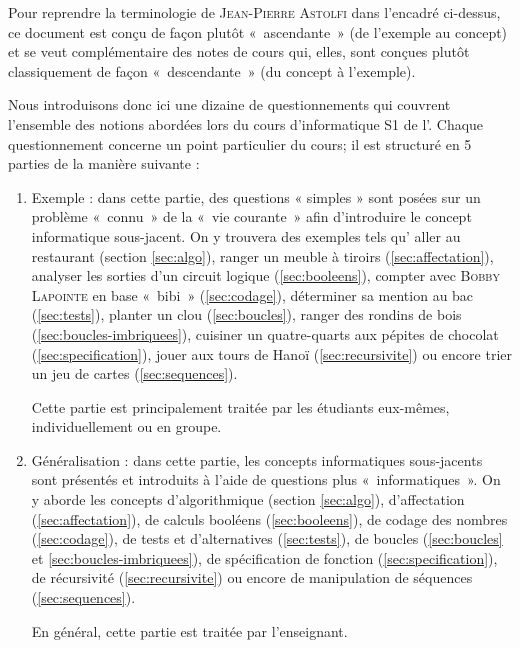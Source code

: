 \newpage
Pour reprendre la terminologie de \textsc{Jean-Pierre Astolfi} dans l'encadré ci-dessus,
ce document est  conçu de façon plutôt «~ascendante~» (de l'exemple au concept) et se veut 
complémentaire des notes de cours \cite{cours} qui, elles, sont conçues plutôt classiquement
de façon «~descendante~» (du concept à l'exemple).

Nous introduisons donc ici une dizaine de questionnements qui couvrent
l'ensemble des notions abordées lors du cours d'informatique S1 de l'\enib.
Chaque questionnement concerne un point particulier du cours; il
est structuré en 5 parties de la manière suivante :
\begin{enumerate}
\item Exemple : dans cette partie, des questions « simples » sont posées 
	sur un problème «~connu~» de la «~vie courante~» afin d'introduire 
	le concept informatique sous-jacent. On y trouvera des
	exemples tels qu'
		aller au restaurant (section \ref{sec:algo}),
		ranger un meuble à tiroirs (\ref{sec:affectation}),
		analyser les sorties d'un circuit logique (\ref{sec:booleens}),
		compter avec \textsc{Bobby Lapointe} en base «~bibi~» (\ref{sec:codage}),
		déterminer sa mention au bac (\ref{sec:tests}),
		planter un clou (\ref{sec:boucles}),
		ranger des rondins de bois (\ref{sec:boucles-imbriquees}),
		cuisiner un quatre-quarts aux pépites de chocolat (\ref{sec:specification}),
		jouer aux tours de Hanoï  (\ref{sec:recursivite}) ou encore
		trier un jeu de cartes (\ref{sec:sequences}).
		
		Cette partie est principalement traitée par les étudiants eux-mêmes, individuellement ou 
		en groupe.
		
\item Généralisation : dans cette partie, les concepts informatiques sous-jacents
	sont présentés et introduits à l'aide de questions plus «~informatiques~».
	On y aborde les concepts 
	d'algorithmique (section \ref{sec:algo}),
	d'affectation (\ref{sec:affectation}),
	de calculs booléens (\ref{sec:booleens}),
	de codage des nombres (\ref{sec:codage}),
	de tests et d'alternatives (\ref{sec:tests}),
	de boucles (\ref{sec:boucles} et \ref{sec:boucles-imbriquees}),
	de spécification de fonction (\ref{sec:specification}),
	de récursivité (\ref{sec:recursivite}) ou encore
    de manipulation de séquences (\ref{sec:sequences}).

	En général, cette partie est traitée par l'enseignant.
	

\end{enumerate}
